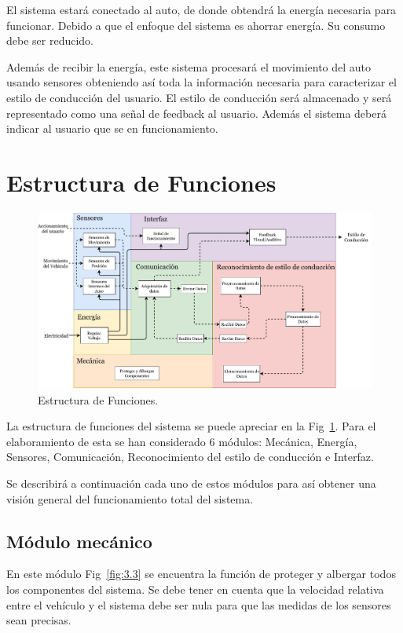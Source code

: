 El sistema estará conectado al auto, de donde obtendrá la energía necesaria para funcionar. Debido a que el enfoque del sistema es ahorrar energía. Su consumo debe ser reducido.

Además de recibir la energía, este sistema procesará el movimiento del auto usando sensores obteniendo así toda la información necesaria para caracterizar el estilo de conducción del usuario. El estilo de conducción será almacenado y será representado como una señal de feedback al usuario. Además el sistema deberá indicar al usuario que se en funcionamiento.

\section{Estructura de Funciones}

\begin{figure}
\centering
\includegraphics[width=\textwidth]{Tab3.pdf}
\caption{Estructura de Funciones.}
\label{fig:3.2}
\end{figure}

La estructura de funciones del sistema se puede apreciar en la Fig~\ref{fig:3.2}. Para el elaboramiento de esta se han considerado 6 módulos: Mecánica, Energía, Sensores, Comunicación, Reconocimiento del estilo de conducción e Interfaz.

Se describirá a continuación cada uno de estos módulos para así obtener una visión general del funcionamiento total del sistema.

\subsection{Módulo mecánico}
En este módulo Fig~\ref{fig:3.3} se encuentra la  función de proteger y albergar todos los componentes del sistema. Se debe tener en cuenta que la velocidad relativa entre el vehículo y el sistema debe ser nula para que las medidas de los sensores sean precisas.

